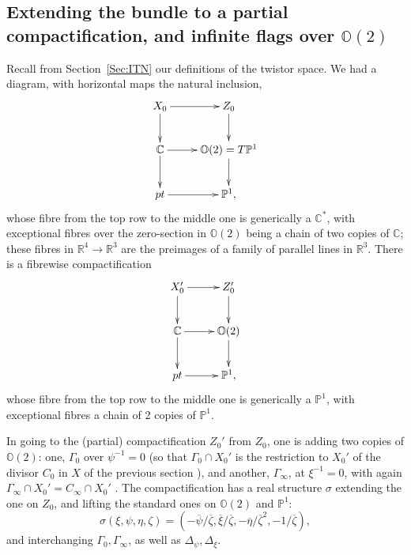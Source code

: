 \documentclass[12pt]{article}
\theoremstyle{definition}
\theoremstyle{remark}
\numberwithin{theorem}{section}
\def\bR{{\mathbb {R}}}
\def\bC{{\mathbb {C}}}
\def\bP{{\mathbb {P}}}
\def\bO{{\mathbb {O}}}
\begin{document}
 \subsection{Extending the bundle to a partial compactification, and infinite flags over $\bO(2)$}
Recall from Section~\ref{Sec:ITN}   our definitions of the twistor space.  We had a diagram, with horizontal maps the natural inclusion, 
   $$ \xymatrix{  X_0\ar[r]\ar[d]&Z_0\ar[d]\\ \bC\ar[r] \ar[d]& \bO(2)= T\bP^1\ar[d]\\ pt\ar[r] & \bP^1,}$$  
 whose fibre from the top row to the middle one is generically a $\bC^*$, with exceptional fibres over the zero-section in $\bO(2)$ being a chain of two copies of $\bC$;  these fibres   in $\bR^4\rightarrow \bR^3$ are  the preimages of a family of parallel lines in $\bR^3$.  There is a fibrewise compactification 
$$ \xymatrix{  X_0'\ar[r]\ar[d]&Z_0'\ar[d]\\ \bC \ar[r] \ar[d]& \bO(2)\ar[d]\\ pt\ar[r] & \bP^1,}$$ 
whose fibre from the top row to the middle one is generically a $\bP^1$, with exceptional fibres a chain of 2 copies of $\bP^1$.
 
   In going to the (partial) compactification $Z_0'$ from $Z_0$, one is adding two copies of $\bO(2)$: one, $\Gamma_0$  over  $\psi^{-1} = 0$ (so that $\Gamma_0\cap X_0'$ is the restriction to $X_0'$ of the divisor $C_0$ in $X$  of the previous section  ), and another, $\Gamma_\infty$, at $\xi^{-1}  = 0$, with again $\Gamma_\infty\cap X_0' = C_\infty\cap X_0'$ . The compactification has a real structure $\sigma$ extending the one on $Z_0$, and lifting the standard ones on $\bO(2)$ and $\bP^1$:
   $$\sigma(\xi,\psi,\eta,\zeta) = (-\overline \psi/\overline \zeta,\overline \xi/\overline \zeta,-\overline \eta/\overline\zeta^2,-1/\overline\zeta),$$
 and interchanging $\Gamma_0, \Gamma_\infty$, as well as $\Delta_\psi, \Delta_\xi$.
 
\end{document}
